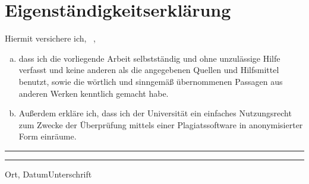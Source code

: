 
\chapter*{Eigenst{\"a}ndigkeitserkl{\"a}rung}

Hiermit versichere ich, \authornamefirst~\authornamelast,
\begin{enumerate}[a)]
    \item dass ich die vorliegende Arbeit selbstst{\"a}ndig und ohne unzul{\"a}ssige Hilfe verfasst und keine anderen als die angegebenen Quellen und Hilfsmittel benutzt, sowie die w{\"o}rtlich und sinngem{\"a}{\ss} {\"u}bernommenen Passagen aus anderen Werken kenntlich gemacht habe.
    \item Außerdem erkl{\"a}re ich, dass ich der Universit{\"a}t ein einfaches Nutzungsrecht zum Zwecke der {\"U}berpr{\"u}fung mittels einer Plagiatssoftware in anonymisierter Form einr{\"a}ume.
\end{enumerate}

\vspace{2cm}


\rule[0pt]{0.45\textwidth}{1pt}\hfill\rule[0pt]{0.45\textwidth}{1pt}

Ort, Datum\hfill Unterschrift

	
